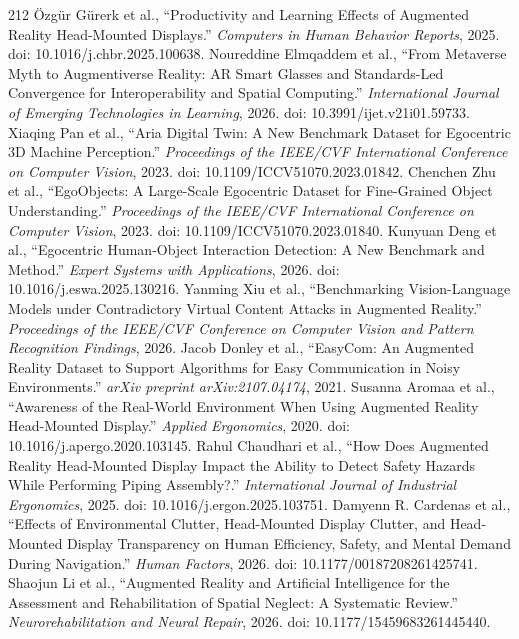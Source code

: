 \begin{thebibliography}{212}
 {\"O}zg{\"u}r G{\"u}rerk et al., ``Productivity and Learning Effects of Augmented Reality Head-Mounted Displays.'' \emph{Computers in Human Behavior Reports}, 2025. doi: 10.1016/j.chbr.2025.100638.
 Noureddine Elmqaddem et al., ``From Metaverse Myth to Augmentiverse Reality: {AR} Smart Glasses and Standards-Led Convergence for Interoperability and Spatial Computing.'' \emph{International Journal of Emerging Technologies in Learning}, 2026. doi: 10.3991/ijet.v21i01.59733.
 Xiaqing Pan et al., ``Aria Digital Twin: A New Benchmark Dataset for Egocentric 3D Machine Perception.'' \emph{Proceedings of the IEEE/CVF International Conference on Computer Vision}, 2023. doi: 10.1109/ICCV51070.2023.01842.
 Chenchen Zhu et al., ``EgoObjects: A Large-Scale Egocentric Dataset for Fine-Grained Object Understanding.'' \emph{Proceedings of the IEEE/CVF International Conference on Computer Vision}, 2023. doi: 10.1109/ICCV51070.2023.01840.
 Kunyuan Deng et al., ``Egocentric Human-Object Interaction Detection: A New Benchmark and Method.'' \emph{Expert Systems with Applications}, 2026. doi: 10.1016/j.eswa.2025.130216.
 Yanming Xiu et al., ``Benchmarking Vision-Language Models under Contradictory Virtual Content Attacks in Augmented Reality.'' \emph{Proceedings of the IEEE/CVF Conference on Computer Vision and Pattern Recognition Findings}, 2026.
 Jacob Donley et al., ``{EasyCom}: An Augmented Reality Dataset to Support Algorithms for Easy Communication in Noisy Environments.'' \emph{arXiv preprint arXiv:2107.04174}, 2021.
 Susanna Aromaa et al., ``Awareness of the Real-World Environment When Using Augmented Reality Head-Mounted Display.'' \emph{Applied Ergonomics}, 2020. doi: 10.1016/j.apergo.2020.103145.
 Rahul Chaudhari et al., ``How Does Augmented Reality Head-Mounted Display Impact the Ability to Detect Safety Hazards While Performing Piping Assembly?.'' \emph{International Journal of Industrial Ergonomics}, 2025. doi: 10.1016/j.ergon.2025.103751.
 Damyenn R. Cardenas et al., ``Effects of Environmental Clutter, Head-Mounted Display Clutter, and Head-Mounted Display Transparency on Human Efficiency, Safety, and Mental Demand During Navigation.'' \emph{Human Factors}, 2026. doi: 10.1177/00187208261425741.
 Shaojun Li et al., ``Augmented Reality and Artificial Intelligence for the Assessment and Rehabilitation of Spatial Neglect: A Systematic Review.'' \emph{Neurorehabilitation and Neural Repair}, 2026. doi: 10.1177/15459683261445440.

\end{thebibliography}

